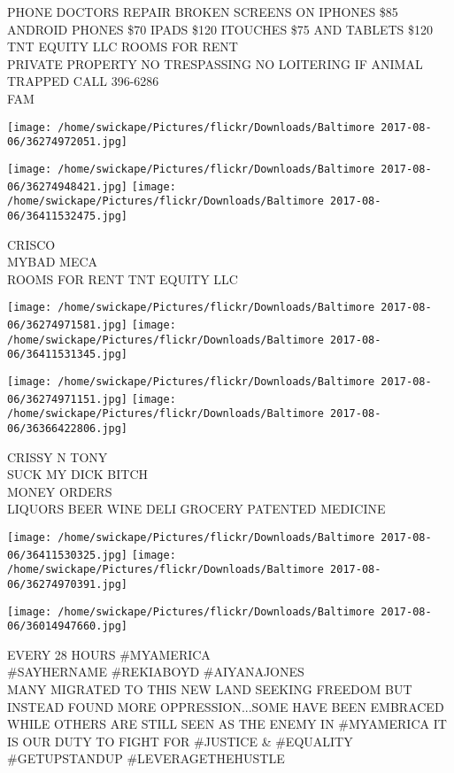 \documentclass[10pt,letterpaper]{article}
\begin{document}
PHONE DOCTORS REPAIR BROKEN SCREENS ON IPHONES \$85 ANDROID PHONES \$70 IPADS \$120 ITOUCHES \$75 AND TABLETS \$120\\
TNT EQUITY LLC ROOMS FOR RENT\\
PRIVATE PROPERTY NO TRESPASSING NO LOITERING IF ANIMAL TRAPPED CALL 396{-}6286\\
FAM\\
\pagebreak

\texttt{[image: /home/swickape/Pictures/flickr/Downloads/Baltimore 2017-08-06/36274972051.jpg]}

\vspace{0.25in}
\texttt{[image: /home/swickape/Pictures/flickr/Downloads/Baltimore 2017-08-06/36274948421.jpg]}
\texttt{[image: /home/swickape/Pictures/flickr/Downloads/Baltimore 2017-08-06/36411532475.jpg]}

CRISCO\\
MYBAD MECA\\
ROOMS FOR RENT TNT EQUITY LLC\\
\pagebreak

\texttt{[image: /home/swickape/Pictures/flickr/Downloads/Baltimore 2017-08-06/36274971581.jpg]}
\texttt{[image: /home/swickape/Pictures/flickr/Downloads/Baltimore 2017-08-06/36411531345.jpg]}

\texttt{[image: /home/swickape/Pictures/flickr/Downloads/Baltimore 2017-08-06/36274971151.jpg]}
\texttt{[image: /home/swickape/Pictures/flickr/Downloads/Baltimore 2017-08-06/36366422806.jpg]}

CRISSY N TONY\\
SUCK MY DICK BITCH\\
MONEY ORDERS\\
LIQUORS BEER WINE DELI GROCERY PATENTED MEDICINE\\
\pagebreak

\texttt{[image: /home/swickape/Pictures/flickr/Downloads/Baltimore 2017-08-06/36411530325.jpg]}
\texttt{[image: /home/swickape/Pictures/flickr/Downloads/Baltimore 2017-08-06/36274970391.jpg]}

\vspace{0.25in}
\texttt{[image: /home/swickape/Pictures/flickr/Downloads/Baltimore 2017-08-06/36014947660.jpg]}

EVERY 28 HOURS \#MYAMERICA\\
\#SAYHERNAME \#REKIABOYD \#AIYANAJONES\\
MANY MIGRATED TO THIS NEW LAND SEEKING FREEDOM BUT INSTEAD FOUND MORE OPPRESSION...SOME HAVE BEEN EMBRACED WHILE OTHERS ARE STILL SEEN AS THE ENEMY IN \#MYAMERICA IT IS OUR DUTY TO FIGHT FOR \#JUSTICE \& \#EQUALITY \#GETUPSTANDUP \#LEVERAGETHEHUSTLE\\
\pagebreak
\end{document}
